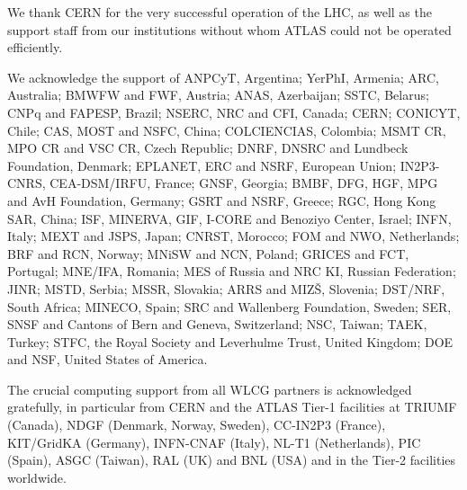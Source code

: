 
We thank CERN for the very successful operation of the LHC, as well as the
support staff from our institutions without whom ATLAS could not be
operated efficiently.

We acknowledge the support of ANPCyT, Argentina; YerPhI, Armenia; ARC,
Australia; BMWFW and FWF, Austria; ANAS, Azerbaijan; SSTC, Belarus; CNPq and FAPESP,
Brazil; NSERC, NRC and CFI, Canada; CERN; CONICYT, Chile; CAS, MOST and NSFC,
China; COLCIENCIAS, Colombia; MSMT CR, MPO CR and VSC CR, Czech Republic;
DNRF, DNSRC and Lundbeck Foundation, Denmark; EPLANET, ERC and NSRF, European Union;
IN2P3-CNRS, CEA-DSM/IRFU, France; GNSF, Georgia; BMBF, DFG, HGF, MPG and AvH
Foundation, Germany; GSRT and NSRF, Greece; RGC, Hong Kong SAR, China; ISF, MINERVA, GIF, I-CORE and Benoziyo Center, Israel; INFN, Italy; MEXT and JSPS, Japan; CNRST, Morocco; FOM and NWO, Netherlands; BRF and RCN, Norway; MNiSW and NCN, Poland; GRICES and FCT, Portugal; MNE/IFA, Romania; MES of Russia and NRC KI, Russian Federation; JINR; MSTD,
Serbia; MSSR, Slovakia; ARRS and MIZ\v{S}, Slovenia; DST/NRF, South Africa;
MINECO, Spain; SRC and Wallenberg Foundation, Sweden; SER, SNSF and Cantons of
Bern and Geneva, Switzerland; NSC, Taiwan; TAEK, Turkey; STFC, the Royal
Society and Leverhulme Trust, United Kingdom; DOE and NSF, United States of
America.

The crucial computing support from all WLCG partners is acknowledged
gratefully, in particular from CERN and the ATLAS Tier-1 facilities at
TRIUMF (Canada), NDGF (Denmark, Norway, Sweden), CC-IN2P3 (France),
KIT/GridKA (Germany), INFN-CNAF (Italy), NL-T1 (Netherlands), PIC (Spain),
ASGC (Taiwan), RAL (UK) and BNL (USA) and in the Tier-2 facilities
worldwide.

